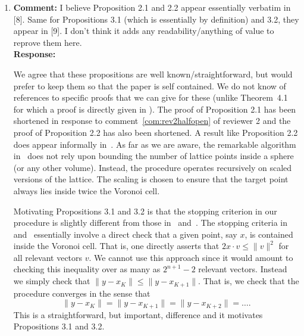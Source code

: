 \documentclass[a4paper,10pt]{article}
\begin{document}
\begin{enumerate}

\item\textbf{Comment:} 
I believe Proposition 2.1 and 2.2 appear essentially verbatim in [8]. Same for Propositions
3.1 (which is essentially by definition) and 3.2, they appear in [9]. I don’t think it adds any
readability/anything of value to reprove them here.
\\\textbf{Response:}

We agree that these propositions are well known/straightforward, but would prefer to keep them so that the paper is self contained. We do not know of references to specific proofs that we can give for these (unlike Theorem~4.1 for which a proof is directly given in \cite[Theorem~3]{ConwaySloane1992_voronoi_lattice_3d_obtuse_superbases}).  The proof of Proposition 2.1 has been shortened in response to comment~\ref{com:rev2halfopen} of reviewer 2 and the proof of Proposition 2.2 has also been shortened.  A result like Proposition 2.2 does appear informally in~\cite[Sec~5]{Shalvi_iterativeslicer_2009}.  As far as we are aware, the remarkable algorithm in~\cite{MicciancioVoulgaris_deterministic_jv_2013} does not rely upon bounding the number of lattice points inside a sphere (or any other volume).  Instead, the procedure operates recursively on scaled versions of the lattice.  The scaling is chosen to ensure that the target point always lies inside twice the Voronoi cell. 

Motivating Propositions 3.1 and 3.2 is that the stopping criterion in our procedure is slightly different from those in~\cite{Shalvi_iterativeslicer_2009} and~\cite{MicciancioVoulgaris_deterministic_jv_2013}.  The stopping criteria in~\cite{Shalvi_iterativeslicer_2009} and~\cite{MicciancioVoulgaris_deterministic_jv_2013} essentially involve a direct check that a given point, say $x$, is contained inside the Voronoi cell.  That is, one directly asserts that $2 x \cdot v \leq \|v\|^2$ for all relevant vectors $v$.  We cannot use this approach since it would amount to checking this inequality over as many as $2^{n+1}-2$ relevant vectors.  Instead we simply check that $\|y - x_K\| \leq \|y - x_{K+1}\|$.  That is, we check that the procedure converges in the sense that 
\[
\|y - x_K\| = \|y - x_{K+1}\| = \|y - x_{K+2}\| = \dots.
\]
This is a straightforward, but important, difference and it motivates Propositions 3.1 and 3.2.

\newcommand{\rng}{\operatorname{rng}}
\newcommand{\subrng}{\operatorname{subr}}
\newcommand{\decrng}{\operatorname{decrng}}


\end{enumerate}
\end{document}

